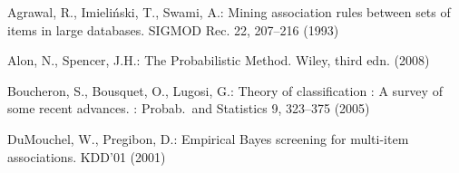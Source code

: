 \begin{thebibliography}{33}
\providecommand{\natexlab}[1]{#1}
\providecommand{\url}[1]{\texttt{#1}}
\providecommand{\urlprefix}{}

Agrawal, R., Imieli\'{n}ski, T., Swami, A.: Mining association rules between
  sets of items in large databases.
\newblock SIGMOD Rec. 22, 207--216 (1993)%

Alon, N., Spencer, J.H.: The Probabilistic Method.
\newblock Wiley, third edn. (2008)

\iffalse
\bibitem[{Bolton et~al.(2002)Bolton, Hand, and Adams}]{BoltonHA02}
Bolton, R.J., Hand, D.J., Adams, N.M.: Determining hit rate in pattern search.
\newblock In: Pattern Detection and Discovery. LNCS, vol. 2447, pp. 36--48 (2002)
\fi

Boucheron, S., Bousquet, O., Lugosi, G.: Theory of classification : A survey of
  some recent advances.
: Probab.~and Statistics 9, 323--375 (2005)%

  \iffalse
\bibitem[{Brijs et~al.(1999)Brijs, Swinnen, Vanhoof, and Wets}]{BrijsSVW99}
Brijs, T., Swinnen, G., Vanhoof, K., Wets, G.: Using association rules for
  product assortment decisions: A case study.
\newblock KDD'99 (1999)
\fi

\iffalse
\bibitem[{Dudoit et~al.(2003)Dudoit, Shaffer, and Boldrick}]{DudoitSB03}
Dudoit, S., Shaffer, J., Boldrick, J.: Multiple hypothesis testing in
  microarray experiments.
\newblock Statistical Science 18(1), 71--103 (2003)
\fi

DuMouchel, W., Pregibon, D.: Empirical {B}ayes screening for multi-item
  associations.
\newblock KDD'01 (2001)


\end{thebibliography}

